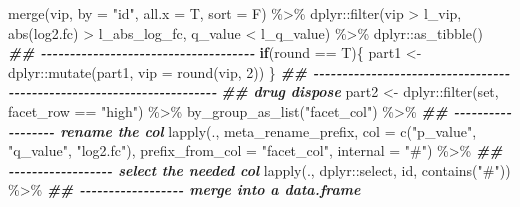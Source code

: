 \documentclass[
]{article}
\newenvironment{Shaded}{\begin{snugshade}}{\end{snugshade}}
\newcommand{\AttributeTok}[1]{\textcolor[rgb]{0.77,0.63,0.00}{#1}}
\newcommand{\ControlFlowTok}[1]{\textcolor[rgb]{0.13,0.29,0.53}{\textbf{#1}}}
\newcommand{\DecValTok}[1]{\textcolor[rgb]{0.00,0.00,0.81}{#1}}
\newcommand{\DocumentationTok}[1]{\textcolor[rgb]{0.56,0.35,0.01}{\textbf{\textit{#1}}}}
\newcommand{\FunctionTok}[1]{\textcolor[rgb]{0.00,0.00,0.00}{#1}}
\newcommand{\NormalTok}[1]{#1}
\newcommand{\OtherTok}[1]{\textcolor[rgb]{0.56,0.35,0.01}{#1}}
\newcommand{\SpecialCharTok}[1]{\textcolor[rgb]{0.00,0.00,0.00}{#1}}
\newcommand{\StringTok}[1]{\textcolor[rgb]{0.31,0.60,0.02}{#1}}
\begin{document}
\begin{Shaded}
\begin{Highlighting}[]
      \FunctionTok{merge}\NormalTok{(vip, }\AttributeTok{by =} \StringTok{"id"}\NormalTok{, }\AttributeTok{all.x =}\NormalTok{ T, }\AttributeTok{sort =}\NormalTok{ F) }\SpecialCharTok{\%\textgreater{}\%}
\NormalTok{      dplyr}\SpecialCharTok{::}\FunctionTok{filter}\NormalTok{(vip }\SpecialCharTok{\textgreater{}}\NormalTok{ l\_vip,}
                    \FunctionTok{abs}\NormalTok{(log2.fc) }\SpecialCharTok{\textgreater{}}\NormalTok{ l\_abs\_log\_fc,}
\NormalTok{                    q\_value }\SpecialCharTok{\textless{}}\NormalTok{ l\_q\_value) }\SpecialCharTok{\%\textgreater{}\%}
\NormalTok{      dplyr}\SpecialCharTok{::}\FunctionTok{as\_tibble}\NormalTok{()}
    \DocumentationTok{\#\# {-}{-}{-}{-}{-}{-}{-}{-}{-}{-}{-}{-}{-}{-}{-}{-}{-}{-}{-}{-}{-}{-}{-}{-}{-}{-}{-}{-}{-}{-}{-}{-}{-}{-}{-}{-}{-} }
    \ControlFlowTok{if}\NormalTok{(round }\SpecialCharTok{==}\NormalTok{ T)\{}
\NormalTok{      part1 }\OtherTok{\textless{}{-}}\NormalTok{ dplyr}\SpecialCharTok{::}\FunctionTok{mutate}\NormalTok{(part1, }\AttributeTok{vip =} \FunctionTok{round}\NormalTok{(vip, }\DecValTok{2}\NormalTok{))}
\NormalTok{    \}}
    \DocumentationTok{\#\# {-}{-}{-}{-}{-}{-}{-}{-}{-}{-}{-}{-}{-}{-}{-}{-}{-}{-}{-}{-}{-}{-}{-}{-}{-}{-}{-}{-}{-}{-}{-}{-}{-}{-}{-}{-}{-}{-}{-}{-}{-}{-}{-}{-}{-}{-}{-}{-}{-}{-}{-}{-}{-}{-}{-}{-}{-}{-}{-}{-}{-}{-}{-}{-}{-}{-}{-}{-}{-}{-} }
    \DocumentationTok{\#\# drug dispose}
\NormalTok{    part2 }\OtherTok{\textless{}{-}}\NormalTok{ dplyr}\SpecialCharTok{::}\FunctionTok{filter}\NormalTok{(set, facet\_row }\SpecialCharTok{==} \StringTok{"high"}\NormalTok{) }\SpecialCharTok{\%\textgreater{}\%}
      \FunctionTok{by\_group\_as\_list}\NormalTok{(}\StringTok{"facet\_col"}\NormalTok{) }\SpecialCharTok{\%\textgreater{}\%}
      \DocumentationTok{\#\# {-}{-}{-}{-}{-}{-}{-}{-}{-}{-}{-}{-}{-}{-}{-}{-}{-}{-} rename the col}
      \FunctionTok{lapply}\NormalTok{(., meta\_rename\_prefix,}
             \AttributeTok{col =} \FunctionTok{c}\NormalTok{(}\StringTok{"p\_value"}\NormalTok{, }\StringTok{"q\_value"}\NormalTok{, }\StringTok{"log2.fc"}\NormalTok{),}
             \AttributeTok{prefix\_from\_col =} \StringTok{"facet\_col"}\NormalTok{, }\AttributeTok{internal =} \StringTok{"\#"}\NormalTok{) }\SpecialCharTok{\%\textgreater{}\%}
      \DocumentationTok{\#\# {-}{-}{-}{-}{-}{-}{-}{-}{-}{-}{-}{-}{-}{-}{-}{-}{-}{-} select the needed col}
      \FunctionTok{lapply}\NormalTok{(., dplyr}\SpecialCharTok{::}\NormalTok{select,}
\NormalTok{             id, }\FunctionTok{contains}\NormalTok{(}\StringTok{"\#"}\NormalTok{)) }\SpecialCharTok{\%\textgreater{}\%}
      \DocumentationTok{\#\# {-}{-}{-}{-}{-}{-}{-}{-}{-}{-}{-}{-}{-}{-}{-}{-}{-}{-} merge into a data.frame}

\end{Highlighting}
\end{Shaded}
\end{document}
